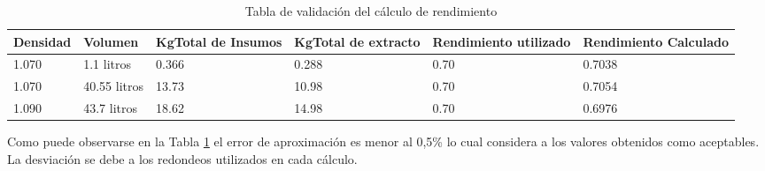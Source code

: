\begin{table}[H]
    \centering
    \begin{tabularx}{\textwidth}{|X|X|X|X|X|X|}
        \hline
        Densidad & Volumen & KgTotal de Insumos & KgTotal de extracto & Rendimiento utilizado & Rendimiento Calculado \\
        \hline
        \hline
        1.070 & 1.1 litros & 0.366 & 0.288 & 0.70 & 0.7038\\ \hline
        1.070 & 40.55 litros & 13.73 & 10.98 & 0.70 & 0.7054 \\ \hline
        1.090 & 43.7 litros & 18.62 & 14.98 & 0.70 & 0.6976 \\ \hline
    \end{tabularx}
    \caption{Tabla de validación del cálculo de rendimiento  }
    \label{tab:rendimiento}
\end{table}

\par Como puede observarse en la Tabla \ref{tab:rendimiento} el error de aproximación es menor al 0,5\% lo cual considera a los valores obtenidos como aceptables. La desviación se debe a los redondeos utilizados en cada cálculo. 

